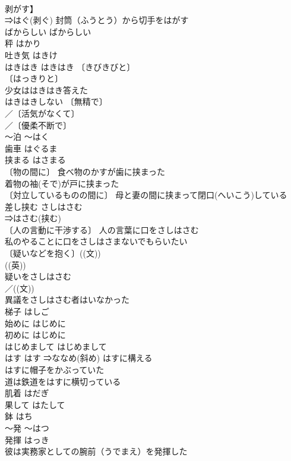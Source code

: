 \documentclass[8pt]{extreport}
\begin{document}
\begin{CJK}{UTF8}{min}
\\	剥がす】	
\\	⇒はぐ(剥ぐ) 封筒（ふうとう）から切手をはがす 
\\	ばからしい	ばからしい	
\\	秤	はかり	
\\	吐き気	はきけ	
\\	はきはき	はきはき	〔きびきびと〕
\\	〔はっきりと〕
\\	少女ははきはき答えた 
\\	はきはきしない 〔無精で〕
\\	／〔活気がなくて〕
\\	／〔優柔不断で〕
\\	～泊	～はく	
\\	歯車	はぐるま	
\\	挟まる	はさまる	
\\	〔物の間に〕 食べ物のかすが歯に挟まった 
\\	着物の袖(そで)が戸に挟まった 
\\	〔対立しているものの間に〕 母と妻の間に挟まって閉口(へいこう)している 
\\	差し挟む	さしはさむ	
\\	⇒はさむ(挟む) 
\\	〔人の言動に干渉する〕 人の言葉に口をさしはさむ 
\\	私のやることに口をさしはさまないでもらいたい 
\\	〔疑いなどを抱く〕((文)) 
\\	((英)) 
\\	疑いをさしはさむ 
\\	／((文))
\\	異議をさしはさむ者はいなかった 
\\	梯子	はしご	
\\	始めに	はじめに	
\\	初めに	はじめに	
\\	はじめまして	はじめまして	
\\	はす	はす	⇒ななめ(斜め) はすに構える 
\\	はすに帽子をかぶっていた 
\\	道は鉄道をはすに横切っている 
\\	肌着	はだぎ	
\\	果して	はたして	
\\	鉢	はち	
\\	～発	～はつ	
\\	発揮	はっき	
\\	彼は実務家としての腕前（うでまえ）を発揮した 

\end{CJK}
\end{document}
